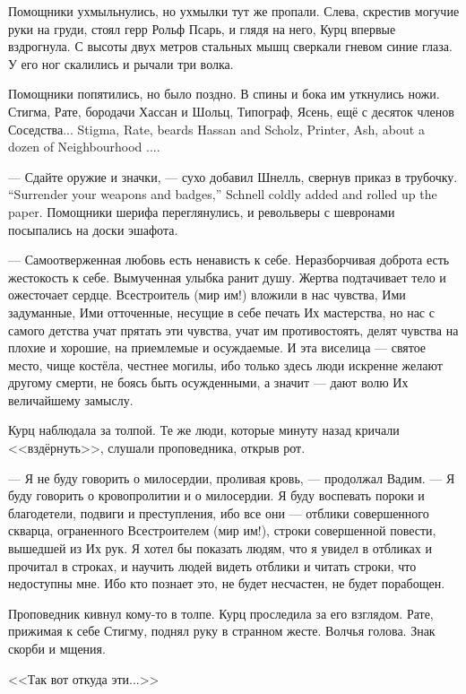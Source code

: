Помощники ухмыльнулись, но ухмылки тут же пропали.
Слева, скрестив могучие руки на груди, стоял герр Рольф Псарь, и глядя на него, Курц впервые вздрогнула.
С высоты двух метров стальных мышц сверкали гневом синие глаза.
У его ног скалились и рычали три волка.

Помощники попятились, но было поздно.
В спины и бока им уткнулись ножи.
{Стигма, Рате, бородачи Хассан и Шольц, Типограф, Ясень, ещё с десяток членов Соседства...}
{Stigma, Rate, beards Hassan and Scholz, Printer, Ash, about a dozen of Neighbourhood ....}

{--- Сдайте оружие и значки, --- сухо добавил Шнелль, свернув приказ в трубочку.}
{``Surrender your weapons and badges,'' Schnell coldly added and rolled up the paper.}
Помощники шерифа переглянулись, и револьверы с шевронами посыпались на доски эшафота.

\textspace

--- Самоотверженная любовь есть ненависть к себе.
Неразборчивая доброта есть жестокость к себе.
Вымученная улыбка ранит душу.
Жертва подтачивает тело и ожесточает сердце.
Всестроитель (мир им!) вложили в нас чувства, Ими задуманные, Ими отточенные, несущие в себе печать Их мастерства, но нас с самого детства учат прятать эти чувства, учат им противостоять, делят чувства на плохие и хорошие, на приемлемые и осуждаемые.
И эта виселица --- святое место, чище костёла, честнее могилы, ибо только здесь люди искренне желают другому смерти, не боясь быть осужденными, а значит --- дают волю Их величайшему замыслу.

Курц наблюдала за толпой.
Те же люди, которые минуту назад кричали <<вздёрнуть>>, слушали проповедника, открыв рот.

--- Я не буду говорить о милосердии, проливая кровь, --- продолжал Вадим.
--- Я буду говорить о кровопролитии и о милосердии.
Я буду воспевать пороки и благодетели, подвиги и преступления, ибо все они --- отблики совершенного скварца, ограненного Всестроителем (мир им!), строки совершенной повести, вышедшей из Их рук.
Я хотел бы показать людям, что я увидел в отбликах и прочитал в строках, и научить людей видеть отблики и читать строки, что недоступны мне.
Ибо кто познает это, не будет несчастен, не будет порабощен.

Проповедник кивнул кому-то в толпе.
Курц проследила за его взглядом.
Рате, прижимая к себе Стигму, поднял руку в странном жесте.
Волчья голова.
Знак скорби и мщения.

<<Так вот откуда эти...>>

